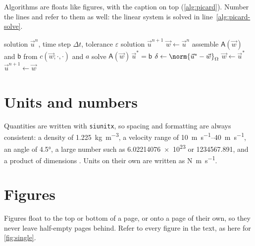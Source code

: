 Algorithms are floats like figures, with the caption on top (\cref{alg:picard}). Number the lines and refer to them as well: the linear system is solved in line~\ref{alg:picard-solve}.

\begin{algorithm}[tbp]
    \caption[Picard iteration for one time step]{Picard iteration for one time step of \cref{form:burgers}.}
    \label{alg:picard}
    \begin{algorithmic}[1]
        \Require solution $\vec{u}^n$, time step $\Delta t$, tolerance $\varepsilon$
        \Ensure solution $\vec{u}^{n+1}$
        \State $\vec{w} \gets \vec{u}^n$ 
        \Repeat
            \State assemble $\mathsf{A}(\vec{w})$ and $\mathsf{b}$ from $c(\vec{w}; \cdot, \cdot)$ and $a$
            \State solve $\mathsf{A}(\vec{w})\, \vec{u}^\ast = \mathsf{b}$ \label{alg:picard-solve}
            \State $\delta \gets \norm{\vec{u}^\ast - \vec{w}}_\Omega$
            \State $\vec{w} \gets \vec{u}^\ast$
        \Until{$\delta < \varepsilon$}
        \State \Return $\vec{u}^{n+1} \gets \vec{w}$
    \end{algorithmic}
\end{algorithm}

\section{Units and numbers}\label{sec:units}

Quantities are written with \texttt{siunitx}, so spacing and formatting are always consistent: a density of \qty{1.225}{\kilo\gram\per\cubic\metre}, a velocity range of \qtyrange{10}{40}{\metre\per\second}, an angle of \ang{4.5}, a large number such as \num{6.02214076e23} or \num{1234567.891}, and a product of dimensions . Units on their own are written as \unit{\newton\metre\per\second}.

\section{Figures}\label{sec:figures}

Figures float to the top or bottom of a page, or onto a page of their own, so they never leave half-empty pages behind. Refer to every figure in the text, as here for \cref{fig:single}.

